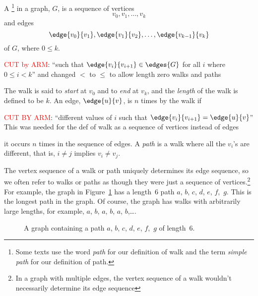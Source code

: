 \begin{definition}\label{def:undirected-path}
A \footnote{Some texts use the word \emph{path} for our
  definition of walk and the term \emph{simple path} for our
  definition of path.} in a graph, $G$, is a sequence of vertices
\begin{equation*}
v_0, v_1, \dots, v_k
\end{equation*}
and edges
\begin{equation*}
    \edge{v_0}{v_1}, \edge{v_1}{v_2}, \dots, \edge{v_{k - 1}}{v_k}
\end{equation*}
of $G$, where $0 \leq k$.
\begin{editingnotes}
   \textcolor{red}{CUT by ARM}: ``such that $\edge{v_i}{v_{i+1}}
  \in \edges{G}$ for all $i$ where $0 \leq i < k$'' and changed $<$ to
  $\leq$ to allow length zero walks and paths
\end{editingnotes}
 The walk is said to
\emph{start} at $v_0$ and to \emph{end} at $v_k$, and the \emph{length} of the walk is defined to be $k$.  An edge,
$\edge{u}{v}$, is  $n$ times by the walk if
\begin{editingnotes}
  \textcolor{red}{CUT BY ARM}:
  ``different values of $i$ such that $\edge{v_i}{v_{i+1}} =
  \edge{u}{v}$'' This was needed for the def of walk as a sequence of
  vertices instead of edges
\end{editingnotes} it occurs $n$ times in the sequence of
edges.  A \emph{path} is a walk where all the $v_i$'s are different,
that is, $i\neq j$ implies $v_i \neq v_j$.
\end{definition}

 The vertex sequence of a walk or path uniquely
determines its edge sequence, so we often refer to walks or paths as
though they were just a sequence of vertices.\footnote{In a graph with
  multiple edges, the vertex sequence of a walk wouldn't necessarily
  determine its edge sequence}
For example, the graph in Figure~\ref{dg} has a length~6 path $a$,
$b$, $c$, $d$, $e$, $f$,~$g$.  This is the longest path in the graph.
Of course, the graph has walks with arbitrarily large lengths, for
example, $a$, $b$, $a$, $b$, $a$, $b$,\dots.

\begin{figure}[htbp]


\caption{A graph containing a path $a$, $b$, $c$, $d$, $e$, $f$,~$g$
  of length~6.}
\label{dg}
\end{figure}

